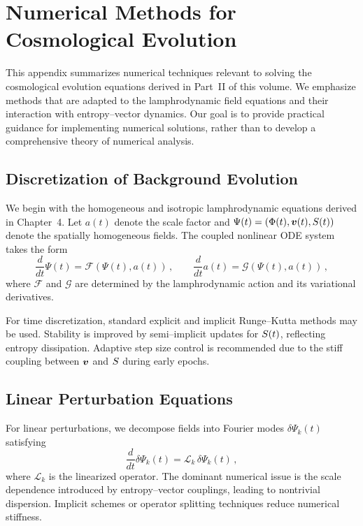 
\chapter{Numerical Methods for Cosmological Evolution}
\label{app:cosmo-numerics}

This appendix summarizes numerical techniques relevant to solving the
cosmological evolution equations derived in Part~II of this volume.
We emphasize methods that are adapted to the lamphrodynamic field
equations and their interaction with entropy--vector dynamics.  Our
goal is to provide practical guidance for implementing numerical
solutions, rather than to develop a comprehensive theory of numerical
analysis.

\section{Discretization of Background Evolution}

We begin with the homogeneous and isotropic lamphrodynamic equations
derived in Chapter~4.  Let $a(t)$ denote the scale factor and
$\Psi(t)=(\Phi(t),\bm{v}(t),S(t))$ denote the spatially
homogeneous fields.  The coupled nonlinear ODE system takes the form
\[
  \frac{d}{dt}\Psi(t) = \mathcal{F}(\Psi(t),a(t))\,,
  \qquad
  \frac{d}{dt}a(t) = \mathcal{G}(\Psi(t),a(t))\,,
\]
where $\mathcal{F}$ and $\mathcal{G}$ are determined by the lamphrodynamic
action and its variational derivatives.

For time discretization, standard explicit and implicit Runge--Kutta
methods may be used.  Stability is improved by semi--implicit updates
for $S(t)$, reflecting entropy dissipation.  Adaptive step size
control is recommended due to the stiff coupling between $\bm{v}$ and
$S$ during early epochs.

\section{Linear Perturbation Equations}

For linear perturbations, we decompose fields into Fourier modes
$\delta\Psi_k(t)$ satisfying
\[
  \frac{d}{dt}\delta\Psi_k(t)=\mathcal{L}_k\,\delta\Psi_k(t)\,,
\]
where $\mathcal{L}_k$ is the linearized operator.  The dominant numerical
issue is the scale dependence introduced by entropy--vector couplings,
leading to nontrivial dispersion.  Implicit schemes or operator
splitting techniques reduce numerical stiffness.

